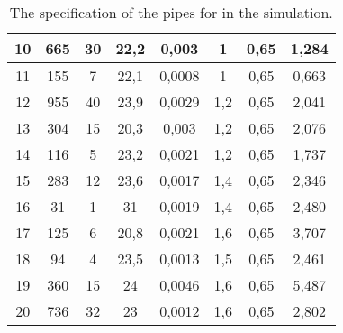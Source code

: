 \begin{table}[H]
\begin{tabular}{|c|c|c|c|c|c|c|c|}
10                                                         & 665            & 30       & 22,2       & 0,003  & 1         & 0,65     & 1,284                                                                          \\ \hline
11                                                         & 155            & 7        & 22,1       & 0,0008 & 1         & 0,65     & 0,663                                                                          \\ \hline
12                                                         & 955            & 40       & 23,9       & 0,0029 & 1,2       & 0,65     & 2,041                                                                          \\ \hline
13                                                         & 304            & 15       & 20,3       & 0,003  & 1,2       & 0,65     & 2,076                                                                          \\ \hline
14                                                         & 116            & 5        & 23,2       & 0,0021 & 1,2       & 0,65     & 1,737                                                                          \\ \hline
15                                                         & 283            & 12       & 23,6       & 0,0017 & 1,4       & 0,65     & 2,346                                                                          \\ \hline
16                                                         & 31             & 1        & 31         & 0,0019 & 1,4       & 0,65     & 2,480                                                                          \\ \hline
17                                                         & 125            & 6        & 20,8       & 0,0021 & 1,6       & 0,65     & 3,707                                                                          \\ \hline
18                                                         & 94             & 4        & 23,5       & 0,0013 & 1,5       & 0,65     & 2,461                                                                          \\ \hline
19                                                         & 360            & 15       & 24         & 0,0046 & 1,6       & 0,65     & 5,487                                                                          \\ \hline
20                                                         & 736            & 32       & 23         & 0,0012 & 1,6       & 0,65     & 2,802                                                                          \\ \hline
\end{tabular}
\caption{The specification of the pipes for in the simulation.}
\label{tab:pipe_data_nonlinear_linear_testv2}
\end{table}

